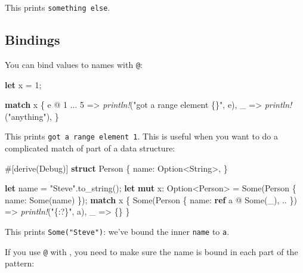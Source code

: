 \documentclass[a4paper,]{book}
\newenvironment{Shaded}{\begin{snugshade}}{\end{snugshade}}
\newcommand{\KeywordTok}[1]{\textcolor[rgb]{0.13,0.29,0.53}{\textbf{{#1}}}}
\newcommand{\DataTypeTok}[1]{\textcolor[rgb]{0.13,0.29,0.53}{{#1}}}
\newcommand{\DecValTok}[1]{\textcolor[rgb]{0.00,0.00,0.81}{{#1}}}
\newcommand{\ConstantTok}[1]{\textcolor[rgb]{0.00,0.00,0.00}{{#1}}}
\newcommand{\StringTok}[1]{\textcolor[rgb]{0.31,0.60,0.02}{{#1}}}
\newcommand{\BuiltInTok}[1]{{#1}}
\newcommand{\PreprocessorTok}[1]{\textcolor[rgb]{0.56,0.35,0.01}{\textit{{#1}}}}
\newcommand{\AttributeTok}[1]{\textcolor[rgb]{0.77,0.63,0.00}{{#1}}}
\newcommand{\NormalTok}[1]{{#1}}
\begin{document}
This prints \texttt{something\ else}.

\subsection{Bindings}\label{bindings}

You can bind values to names with \texttt{@}:

\begin{Shaded}
\begin{Highlighting}[]
\KeywordTok{let} \NormalTok{x = }\DecValTok{1}\NormalTok{;}

\KeywordTok{match} \NormalTok{x \{}
    \NormalTok{e @ }\DecValTok{1} \NormalTok{... }\DecValTok{5} \NormalTok{=> }\PreprocessorTok{println!}\NormalTok{(}\StringTok{"got a range element \{\}"}\NormalTok{, e),}
    \NormalTok{_ => }\PreprocessorTok{println!}\NormalTok{(}\StringTok{"anything"}\NormalTok{),}
\NormalTok{\}}
\end{Highlighting}
\end{Shaded}

This prints \texttt{got\ a\ range\ element\ 1}. This is useful when you
want to do a complicated match of part of a data structure:

\begin{Shaded}
\begin{Highlighting}[]
\AttributeTok{#[}\NormalTok{derive}\AttributeTok{(}\BuiltInTok{Debug}\AttributeTok{)]}
\KeywordTok{struct} \NormalTok{Person \{}
    \NormalTok{name: }\DataTypeTok{Option}\NormalTok{<}\DataTypeTok{String}\NormalTok{>,}
\NormalTok{\}}

\KeywordTok{let} \NormalTok{name = }\StringTok{"Steve"}\NormalTok{.to_string();}
\KeywordTok{let} \KeywordTok{mut} \NormalTok{x: }\DataTypeTok{Option}\NormalTok{<Person> = }\ConstantTok{Some}\NormalTok{(Person \{ name: }\ConstantTok{Some}\NormalTok{(name) \});}
\KeywordTok{match} \NormalTok{x \{}
    \ConstantTok{Some}\NormalTok{(Person \{ name: }\KeywordTok{ref} \NormalTok{a @ }\ConstantTok{Some}\NormalTok{(_), .. \}) => }\PreprocessorTok{println!}\NormalTok{(}\StringTok{"\{:?\}"}\NormalTok{, a),}
    \NormalTok{_ => \{\}}
\NormalTok{\}}
\end{Highlighting}
\end{Shaded}

This prints \texttt{Some("Steve")}: we've bound the inner \texttt{name}
to \texttt{a}.

If you use \texttt{@} with \texttt{\textbar{}}, you need to make sure
the name is bound in each part of the pattern:
\end{document}
